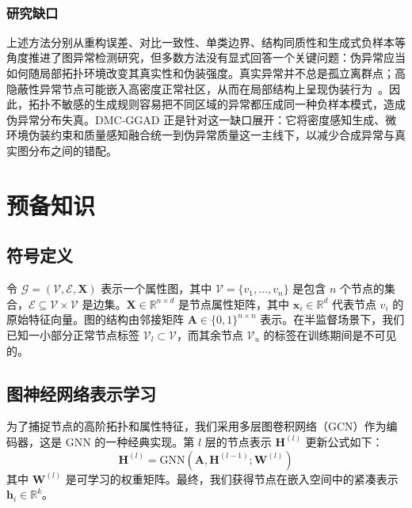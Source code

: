 ﻿﻿﻿﻿    \documentclass[conference, onecolumn]{IEEEtran}
\begin{document}
    \subsubsection{研究缺口}
    上述方法分别从重构误差、对比一致性、单类边界、结构同质性和生成式负样本等角度推进了图异常检测研究，但多数方法没有显式回答一个关键问题：伪异常应当如何随局部拓扑环境改变其真实性和伪装强度。真实异常并不总是孤立离群点；高隐蔽性异常节点可能嵌入高密度正常社区，从而在局部结构上呈现伪装行为~\cite{ref_luo2022, ref_yuan2023}。因此，拓扑不敏感的生成规则容易把不同区域的异常都压成同一种负样本模式，造成伪异常分布失真。DMC-GGAD 正是针对这一缺口展开：它将密度感知生成、微环境伪装约束和质量感知融合统一到伪异常质量这一主线下，以减少合成异常与真实图分布之间的错配。

    \section{预备知识}
    \subsection{符号定义}
    令 $\mathcal{G} = (\mathcal{V}, \mathcal{E}, \mathbf{X})$ 表示一个属性图，其中 $\mathcal{V} = \{v_1, \dots, v_n\}$ 是包含 $n$ 个节点的集合，$\mathcal{E} \subseteq \mathcal{V} \times \mathcal{V}$ 是边集。$\mathbf{X} \in \mathbb{R}^{n \times d}$ 是节点属性矩阵，其中 $\mathbf{x}_i \in \mathbb{R}^d$ 代表节点 $v_i$ 的原始特征向量。图的结构由邻接矩阵 $\mathbf{A} \in \{0, 1\}^{n \times n}$ 表示。在半监督场景下，我们已知一小部分正常节点标签 $\mathcal{V}_l \subset \mathcal{V}$，而其余节点 $\mathcal{V}_u$ 的标签在训练期间是不可见的。

    \subsection{图神经网络表示学习}
    为了捕捉节点的高阶拓扑和属性特征，我们采用多层图卷积网络（GCN）作为编码器，这是 GNN 的一种经典实现。第 $l$ 层的节点表示 $\mathbf{H}^{(l)}$ 更新公式如下：
    \begin{equation}
    \mathbf{H}^{(l)} = \text{GNN}(\mathbf{A}, \mathbf{H}^{(l-1)}; \mathbf{W}^{(l)})
    \end{equation}
    其中 $\mathbf{W}^{(l)}$ 是可学习的权重矩阵。最终，我们获得节点在嵌入空间中的紧凑表示 $\mathbf{h}_i \in \mathbb{R}^k$。
\end{document}
